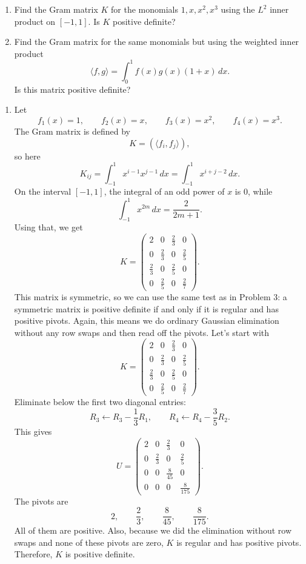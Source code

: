 \documentclass[10pt]{extarticle}
\begin{document}
\newpage

\begin{problem}[Problem 4]
\begin{enumerate}[label=(\alph*)]
\item Find the Gram matrix $K$ for the monomials $1,x,x^2,x^3$ using the $L^2$ inner product on $[-1,1]$. Is $K$ positive definite?
\item Find the Gram matrix for the same monomials but using the weighted inner product
\[
\langle f,g\rangle=\int_0^1f(x)g(x)(1+x)\,dx.
\]
Is this matrix positive definite?
\end{enumerate}
\end{problem}

\begin{enumerate}[label=(\alph*)]
\item Let
\[
f_1(x)=1,\qquad f_2(x)=x,\qquad f_3(x)=x^2,\qquad f_4(x)=x^3.
\]
The Gram matrix is defined by
\[
K=(\langle f_i,f_j\rangle),
\]
so here
\[
K_{ij}=\int_{-1}^1 x^{i-1}x^{j-1}\,dx=\int_{-1}^1 x^{i+j-2}\,dx.
\]
On the interval $[-1,1]$, the integral of an odd power of $x$ is $0$, while
\[
\int_{-1}^1 x^{2m}\,dx=\frac{2}{2m+1}.
\]
Using that, we get
\[
K=
\begin{pmatrix}
2 & 0 & \frac{2}{3} & 0\\[0.4em]
0 & \frac{2}{3} & 0 & \frac{2}{5}\\[0.4em]
\frac{2}{3} & 0 & \frac{2}{5} & 0\\[0.4em]
0 & \frac{2}{5} & 0 & \frac{2}{7}
\end{pmatrix}.
\]
This matrix is symmetric, so we can use the same test as in Problem 3: a symmetric matrix is positive definite if and only if it is regular and has positive pivots. Again, this means we do ordinary Gaussian elimination without any row swaps and then read off the pivots. Let's start with
\[
K=
\begin{pmatrix}
2 & 0 & \frac{2}{3} & 0\\[0.4em]
0 & \frac{2}{3} & 0 & \frac{2}{5}\\[0.4em]
\frac{2}{3} & 0 & \frac{2}{5} & 0\\[0.4em]
0 & \frac{2}{5} & 0 & \frac{2}{7}
\end{pmatrix}.
\]
Eliminate below the first two diagonal entries:
\[
R_3\leftarrow R_3-\frac{1}{3}R_1,
\qquad
R_4\leftarrow R_4-\frac{3}{5}R_2.
\]
This gives
\[
U=
\begin{pmatrix}
2 & 0 & \frac{2}{3} & 0\\[0.4em]
0 & \frac{2}{3} & 0 & \frac{2}{5}\\[0.4em]
0 & 0 & \frac{8}{45} & 0\\[0.4em]
0 & 0 & 0 & \frac{8}{175}
\end{pmatrix}.
\]
The pivots are
\[
2,\qquad \frac{2}{3},\qquad \frac{8}{45},\qquad \frac{8}{175}.
\]
All of them are positive. Also, because we did the elimination without row swaps and none of these pivots are zero, $K$ is regular and has positive pivots. Therefore, $K$ is positive definite.


\end{enumerate}
\end{document}
